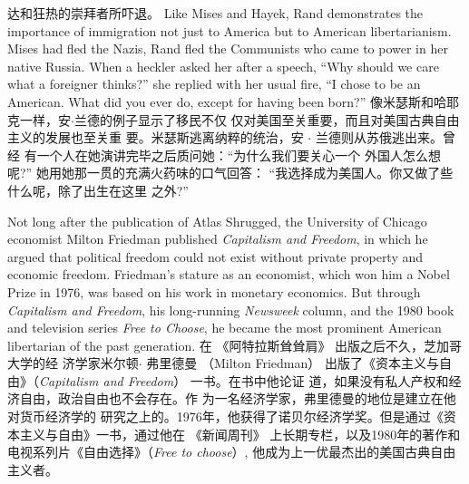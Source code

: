 \begin{paracol}{2}
达和狂热的崇拜者所吓退。
\switchcolumn*
Like Mises and Hayek, Rand demonstrates the importance of
immigration not just to America but to American libertarianism. Mises had fled the Nazis, Rand fled the Communists who
came to power in her native Russia. When a heckler asked her
after a speech, ``Why should we care what a foreigner thinks?''
she replied with her usual fire, ``I chose to be an American. What
did you ever do, except for having been born?''
\switchcolumn
像米瑟斯和哈耶克一样，安$\cdot$兰德的例子显示了移民不仅
仅对美国至关重要，而且对美国古典自由主义的发展也至关重
要。米瑟斯逃离纳粹的统治，安 $\cdot$ 兰德则从苏俄逃出来。曾经
有一个人在她演讲完毕之后质问她：“为什么我们要关心一个
外国人怎么想呢?” 她用她那一贯的充满火药味的口气回答：
“我选择成为美国人。你又做了些什么呢，除了出生在这里
之外?”

Not long after the publication of Atlas Shrugged, the University of
Chicago economist Milton Friedman published \textit{Capitalism and Freedom}, in which he argued that political freedom could not exist
without private property and economic freedom. Friedman's
stature as an economist, which won him a Nobel Prize in 1976,
was based on his work in monetary economics. But through \textit{Capitalism and Freedom}, his long-running \textit{Newsweek} column, and the
1980 book and television series \textit{Free to Choose}, he became the most
prominent American libertarian of the past generation.
\switchcolumn
在 《阿特拉斯耸耸肩》 出版之后不久，芝加哥大学的经
济学家米尔顿$\cdot$ 弗里德曼 （Milton  Friedman） 出版了《资本主义与自由》（\textit{Capitalism  and Freedom}） 一书。在书中他论证
道，如果没有私人产权和经济自由，政治自由也不会存在。作
为一名经济学家，弗里德曼的地位是建立在他对货币经济学的
研究之上的。1976年，他获得了诺贝尔经济学奖。但是通过《资本主义与自由》一书，通过他在 《新闻周刊》 上长期专栏，以及1980年的著作和电视系列片《自由选择》（\textit{Free to choose}）, 他成为上一优最杰出的美国古典自由主义者。


\end{paracol}
